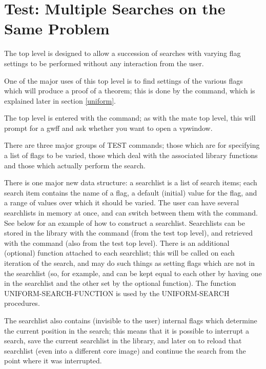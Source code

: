 \section{Test: Multiple Searches on the Same Problem}\label{testtop}

The  top level is designed to allow a succession of searches with
varying flag settings to be performed without any interaction from the user.

One of the major uses of this top level is to find settings of the various
flags which will produce a proof of a theorem; this is done by the
 command, which is explained later in
section \ref{uniform}.

The top level is entered with the  command; as with
the mate top level, this will prompt for a gwff and ask whether you
want to open a vpwindow.

There are three major groups of TEST commands; those which are for
specifying a list of flags to be varied, those which deal with the
associated library functions and those which actually perform the search.

There is one major new data structure: a searchlist is a list of search items;
each search item contains the name of a flag, a default (initial) value for the flag,
and a range of values over which it should be varied. The user can have
several searchlists in memory at once, and can switch between them
with the  command. See below for an example of how to
construct a searchlist. Searchlists can be stored in the library with the
 command (from the test top level), and retrieved with the
 command (also from the test top level). There is an additional
(optional) function attached to each searchlist; this will be called on each iteration of
the search, and may do such things as setting flags which are not in the searchlist (so, for
example,  and  can be kept equal to
each other by having one in the searchlist and the other set by the optional function).
The function UNIFORM-SEARCH-FUNCTION is used by the UNIFORM-SEARCH procedures.

The searchlist also contains (invisible to the user) internal flags which determine the current
position in the search; this means that it is possible to interrupt a search,
save the current searchlist in the library, and later on to reload that searchlist
(even into a different core image) and continue the search from the point where it was
interrupted.

